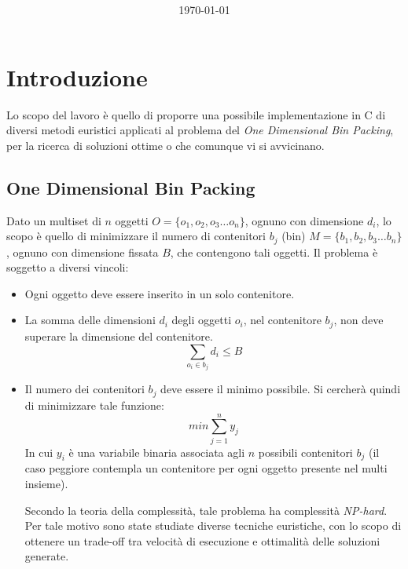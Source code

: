 \documentclass{article}
\title{
\vspace{2in}
\textmd{\textbf{\hmwkClass}}\\
\vspace{0.1in}\large{\textit{\hmwkUniversita}}
\vspace{3in}
}
\author{\textbf{\hmwkAuthorName}}
\date{\today} %
\begin{document}
\begin{center}
\maketitle
\end{center}



\newpage
\tableofcontents
\newpage



\section{Introduzione}
Lo scopo del lavoro è quello di proporre una possibile implementazione in C di diversi metodi euristici applicati al problema del \textit{One Dimensional Bin Packing}, per la ricerca di soluzioni ottime o che comunque vi si avvicinano.

\subsection{One Dimensional Bin Packing}
Dato un multiset di $n$ oggetti $O=\{o_1, o_2, o_3 \dots o_n\}$, ognuno con dimensione $d_i$, lo scopo è quello di minimizzare il numero di contenitori $b_j$ (bin) $M=\{b_1, b_2, b_3 \dots b_{n} \}$, ognuno con dimensione fissata $B$, che contengono tali oggetti.
\newline
\newline
Il problema è soggetto a diversi vincoli:
\begin{itemize}
\item Ogni oggetto deve essere inserito in un solo contenitore.
\item La somma delle dimensioni $d_i$ degli oggetti $o_i$, nel contenitore $b_j$, non deve superare la dimensione del contenitore.
\[
\sum_{o_i \in b_j} d_i \le B
\]
\item Il numero dei contenitori $b_j$ deve essere il minimo possibile. Si cercherà quindi di minimizzare tale funzione:
\[
min \sum_{j=1}^{n} y_j
\]
In cui $y_i$ è una variabile binaria associata agli $n$ possibili contenitori $b_j$ (il caso peggiore contempla un contenitore per ogni oggetto presente nel multi insieme).

Secondo la teoria della complessità, tale problema ha complessità \textit{NP-hard}. Per tale motivo sono state studiate diverse tecniche euristiche, con lo scopo di ottenere un trade-off tra velocità di esecuzione e ottimalità delle soluzioni generate.

\end{itemize}
\end{document}

